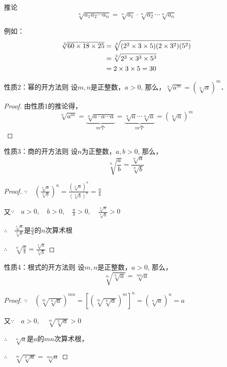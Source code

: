 \begin{blk}{推论}
\[\sqrt[n]{a_1a_2\cdots a_n}=\sqrt[n]{a_1}\cdot \sqrt[n]{a_2}\cdots \sqrt[n]{a_n}\]
\end{blk}

例如：\[\begin{split}
    \sqrt[3]{60\times 18\times 25}&=\sqrt[3]{(2^2\times 3\times 5)(2\times 3^2)(5^2)}\\
    &=\sqrt[3]{2^3\times 3^3\times 5^3}\\
    &=2\times 3\times 5=30
\end{split}\]

\begin{blk}{性质2：幂的开方法则}
设$m,n$是正整数，$a>0$, 那么，$\sqrt[n]{a^m}=\left(\sqrt[n]{a}\right)^m$．

\end{blk}

\begin{proof}
由性质1的推论得，
\[\sqrt[n]{a^m}=\underbrace{\sqrt[n]{a\cdot a\cdots a}}_{\text{$m$个}}=\underbrace{\sqrt[n]{a}\cdots \sqrt[n]{a}}_{\text{$m$个}}=\left(\sqrt[n]{a}\right)^m\]
\end{proof}

\begin{blk}{性质3：商的开方法则}
    设$n$为正整数，$a,b>0$, 那么，
\[\sqrt[n]{\frac{a}{b}}=\frac{\sqrt[n]{a}}{\sqrt[n]{b}}\] 
\end{blk}

\begin{proof}
$\because\quad \left(\frac{\sqrt[n]{a}}{\sqrt[n]{b}}\right)^n=\frac{\left(\sqrt[n]{a}\right)^n}{\left(\sqrt[n]{b}\right)^n}=\frac{a}{b}$

又$\because\quad a>0,\quad   b>0,\quad \frac{a}{b}>0,\quad \frac{\sqrt[n]{a}}{\sqrt[n]{b}}>0$

$\therefore\quad \frac{\sqrt[n]{a}}{\sqrt[n]{b}}$是$\frac{a}{b}$的$n$次算术根

$\therefore\quad \sqrt[n]{\frac{a}{b}}=\frac{\sqrt[n]{a}}{\sqrt[n]{b}}$

\end{proof}

\begin{blk}{性质4：根式的开方法则}
    设$m,n$是正整数，$a>0$, 那么，
\[\sqrt[m]{\sqrt[n]{a}}=\sqrt[mn]{a}\]
\end{blk}

\begin{proof}
    $\because\quad \left(\sqrt[m]{\sqrt[n]{a}}\right)^{mn}=\left[\left(\sqrt[m]{\sqrt[n]{a}}\right)^m\right]^n=\left(\sqrt[n]{a}\right)^n=a$

    又$\because\quad a>0,\quad \sqrt[m]{\sqrt[n]{a}}>0 $
    
    $\therefore\quad \sqrt[n]{a}$是$a$的$mn$次算术根，

    $\therefore\quad \sqrt[m]{\sqrt[n]{a}}=\sqrt[mn]{a}$
\end{proof}



